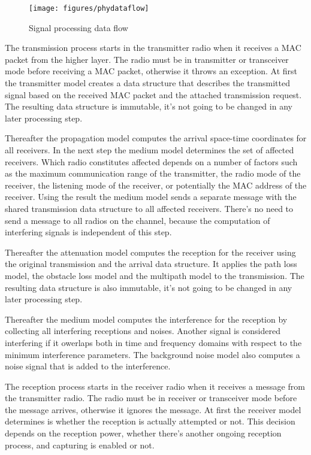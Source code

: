 \begin{figure}[h!]
\centering
\texttt{[image: figures/phydataflow]}
\caption{Signal processing data flow}
\end{figure}

The transmission process starts in the transmitter radio when it receives a MAC
packet from the higher layer. The radio must be in transmitter or transceiver
mode before receiving a MAC packet, otherwise it throws an exception. At first
the transmitter model creates a data structure that describes the transmitted
signal based on the received MAC packet and the attached transmission request.
The resulting data structure is immutable, it's not going to be changed in any
later processing step.

Thereafter the propagation model computes the arrival space-time coordinates for
all receivers. In the next step the medium model determines the set of affected
receivers. Which radio constitutes affected depends on a number of factors such
as the maximum communication range of the transmitter, the radio mode of the
receiver, the listening mode of the receiver, or potentially the MAC address of
the receiver. Using the result the medium model sends a separate message with
the shared transmission data structure to all affected receivers. There's no
need to send a message to all radios on the channel, because the computation
of interfering signals is independent of this step.

Thereafter the attenuation model computes the reception for the receiver using
the original transmission and the arrival data structure. It applies the path
loss model, the obstacle loss model and the multipath model to the transmission.
The resulting data structure is also immutable, it's not going to be changed in
any later processing step.

Thereafter the medium model computes the interference for the reception by
collecting all interfering receptions and noises. Another signal is considered
interfering if it owerlaps both in time and frequency domains with respect to
the minimum interference parameters. The background noise model also computes a
noise signal that is added to the interference.

The reception process starts in the receiver radio when it receives a message
from the transmitter radio. The radio must be in receiver or transceiver mode
before the message arrives, otherwise it ignores the message. At first the
receiver model determines is whether the reception is actually attempted or not.
This decision depends on the reception power, whether there's another ongoing
reception process, and capturing is enabled or not.


